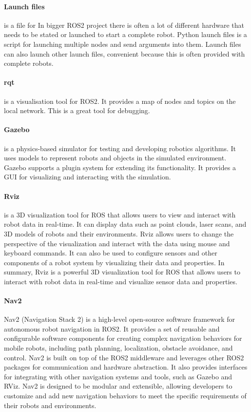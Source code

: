 \paragraph{Launch files} is a file for 
In bigger ROS2 project there is often a lot of different hardware that needs to be stated or launched to start a complete robot. Python launch files is a script for launching multiple nodes and send arguments into them. Launch files can also launch other launch files, convenient because this is often provided with complete robots. 

\paragraph{rqt} is a visualisation tool for ROS2. It provides a map of nodes and topics on the local network. This is a great tool for debugging. 

\paragraph{Gazebo} is a physics-based simulator for testing and developing robotics algorithms. It uses models to represent robots and objects in the simulated environment. Gazebo supports a plugin system for extending its functionality. It provides a GUI for visualizing and interacting with the simulation.  

\paragraph{Rviz} is a 3D visualization tool for ROS that allows users to view and interact with robot data in real-time. It can display data such as point clouds, laser scans, and 3D models of robots and their environments. Rviz allows users to change the perspective of the visualization and interact with the data using mouse and keyboard commands. It can also be used to configure sensors and other components of a robot system by visualizing their data and properties. In summary, Rviz is a powerful 3D visualization tool for ROS that allows users to interact with robot data in real-time and visualize sensor data and properties.

\paragraph{Nav2}
Nav2 (Navigation Stack 2) is a high-level open-source software framework for autonomous robot navigation in ROS2. It provides a set of reusable and configurable software components for creating complex navigation behaviors for mobile robots, including path planning, localization, obstacle avoidance, and control. Nav2 is built on top of the ROS2 middleware and leverages other ROS2 packages for communication and hardware abstraction. It also provides interfaces for integrating with other navigation systems and tools, such as Gazebo and RViz. Nav2 is designed to be modular and extensible, allowing developers to customize and add new navigation behaviors to meet the specific requirements of their robots and environments.

